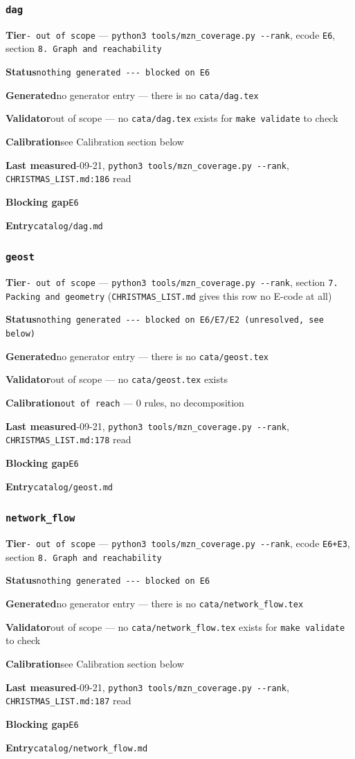 \documentclass[10pt,a4paper]{article}
\newcommand{\entryfield}[2]{{\raggedright\textbf{#1}\quad #2\par}}
\begin{document}
\subsubsection*{\texttt{dag}}
\label{entry:dag}
\entryfield{Tier}{\texttt{- out of scope} --- \texttt{python3 tools/\allowbreak{}mzn\_\allowbreak{}coverage.\allowbreak{}py -\allowbreak{}-\allowbreak{}rank}, ecode \texttt{E6}, section \texttt{8.\allowbreak{} Graph and reachability}}
\entryfield{Status}{\texttt{nothing generated -\allowbreak{}-\allowbreak{}-\allowbreak{} blocked on E6}}
\entryfield{Generated}{no generator entry --- there is no \texttt{cata/dag.tex}}
\entryfield{Validator}{out of scope --- no \texttt{cata/dag.tex} exists for \texttt{make validate} to check}
\entryfield{Calibration}{see Calibration section below}
\entryfield{Last measured}{2026-09-21, \texttt{python3 tools/\allowbreak{}mzn\_\allowbreak{}coverage.\allowbreak{}py -\allowbreak{}-\allowbreak{}rank}, \texttt{CHRISTMAS\_LIST.md:186} read}
\entryfield{Blocking gap}{\texttt{E6}}
\entryfield{Entry}{\texttt{catalog/dag.md}}
\subsubsection*{\texttt{geost}}
\label{entry:geost}
\entryfield{Tier}{\texttt{- out of scope} --- \texttt{python3 tools/\allowbreak{}mzn\_\allowbreak{}coverage.\allowbreak{}py -\allowbreak{}-\allowbreak{}rank}, section \texttt{7. Packing and geometry} (\texttt{CHRISTMAS\_LIST.md} gives this row no E-code at all)}
\entryfield{Status}{\texttt{nothing generated -\allowbreak{}-\allowbreak{}-\allowbreak{} blocked on E6/\allowbreak{}E7/\allowbreak{}E2 (unresolved, see below)}}
\entryfield{Generated}{no generator entry --- there is no \texttt{cata/geost.tex}}
\entryfield{Validator}{out of scope --- no \texttt{cata/geost.tex} exists}
\entryfield{Calibration}{\texttt{out of reach} --- 0 rules, no decomposition}
\entryfield{Last measured}{2026-09-21, \texttt{python3 tools/\allowbreak{}mzn\_\allowbreak{}coverage.\allowbreak{}py -\allowbreak{}-\allowbreak{}rank}, \texttt{CHRISTMAS\_LIST.md:178} read}
\entryfield{Blocking gap}{\texttt{E6}}
\entryfield{Entry}{\texttt{catalog/geost.md}}
\subsubsection*{\texttt{network\_\allowbreak{}flow}}
\label{entry:network-flow}
\entryfield{Tier}{\texttt{- out of scope} --- \texttt{python3 tools/\allowbreak{}mzn\_\allowbreak{}coverage.\allowbreak{}py -\allowbreak{}-\allowbreak{}rank}, ecode \texttt{E6+E3}, section \texttt{8.\allowbreak{} Graph and reachability}}
\entryfield{Status}{\texttt{nothing generated -\allowbreak{}-\allowbreak{}-\allowbreak{} blocked on E6}}
\entryfield{Generated}{no generator entry --- there is no \texttt{cata/network\_flow.tex}}
\entryfield{Validator}{out of scope --- no \texttt{cata/network\_flow.tex} exists for \texttt{make validate} to check}
\entryfield{Calibration}{see Calibration section below}
\entryfield{Last measured}{2026-09-21, \texttt{python3 tools/\allowbreak{}mzn\_\allowbreak{}coverage.\allowbreak{}py -\allowbreak{}-\allowbreak{}rank}, \texttt{CHRISTMAS\_LIST.md:187} read}
\entryfield{Blocking gap}{\texttt{E6}}
\entryfield{Entry}{\texttt{catalog/network\_flow.md}}
\end{document}
